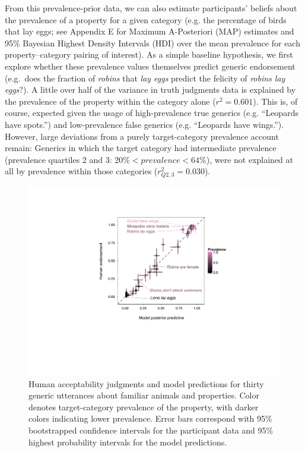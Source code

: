 \documentclass[10pt,letterpaper]{article}
\begin{document}
From this prevalence-prior data, we can also estimate participants' beliefs about the prevalence of a property for a given category (e.g. the percentage of birds that lay eggs; see Appendix E for Maximum A-Posteriori (MAP) estimates and 95\% Bayesian Highest Density Intervals (HDI) over the mean prevalence for each property--category pairing of interest). %
As a simple baseline hypothesis, we first explore whether these prevalence values themselves predict generic endorsement (e.g.~does the fraction of \emph{robins} that \emph{lay eggs} predict the felicity of \emph{robins lay eggs}?).
A little over half of the variance in truth judgments data is explained by the prevalence of the property within the category alone ($r^2 = 0.601$). 
This is, of course, expected given the usage of high-prevalence true generics (e.g. ``Leopards have spots.'') and low-prevalence false generics (e.g. ``Leopards have wings.''). 
However, large deviations from a purely target-category prevalence account remain: Generics in which the target category had intermediate prevalence (prevalence quartiles 2 and 3: $ 20\% < prevalence < 64\%$), were not explained at all by prevalence within those categories ($r_{Q2,3}^2 = 0.030$).

\begin{figure}
\centering
    \includegraphics[width=0.6\columnwidth]{truthjudge-scatter-wLabels.pdf}
    \caption{Human acceptability judgments and model predictions for thirty generic utterances about familiar animals and properties. 
    Color denotes target-category prevalence of the property, with darker colors indicating lower prevalence. 
    Error bars correspond with 95\% bootstrapped confidence intervals for the participant data and 95\% highest probability intervals for the model predictions.
    }
  \label{fig:modeldataBars}
\end{figure}

\end{document}
